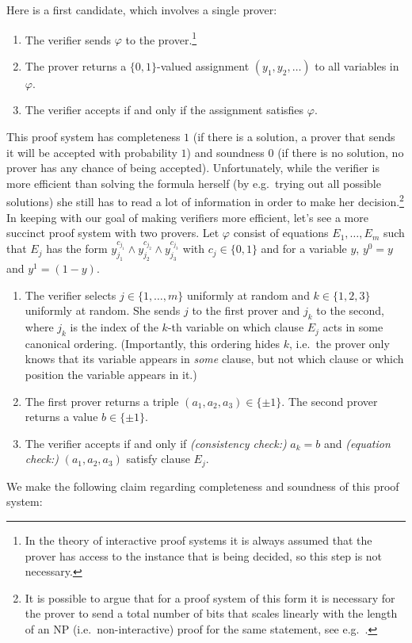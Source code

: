 Here is a first candidate, which involves a single prover:
\begin{enumerate}
\item The verifier sends $\varphi$ to the prover.\footnote{In the theory of interactive proof systems it is always assumed that the prover has access to the instance that is being decided, so this step is not necessary.}
\item The prover returns a $\{0,1\}$-valued assignment $(y_1,y_2,\ldots)$ to all variables in $\varphi$.
\item The verifier accepts if and only if the assignment satisfies $\varphi$. 
\end{enumerate}
This proof system has completeness $1$ (if there is a solution, a prover that sends it will be accepted with probability $1$) and soundness $0$ (if there is no solution, no prover has any chance of being accepted). Unfortunately, while the verifier is more efficient than solving the formula herself (by e.g.\ trying out all possible solutions) she still has to read a lot of information in order to make her decision.\footnote{It is possible to argue that for a proof system of this form it is necessary for the prover to send a total number of bits that scales linearly with the length of an NP (i.e.\ non-interactive) proof for the same statement, see e.g.~\cite{goldreich2001interactive}.} In keeping with our goal of making verifiers more efficient, let's see a more succinct proof system with two provers. Let $\varphi$ consist of equations $E_1,\ldots,E_m$ such that $E_j$ has the form $y_{j_1}^{c_{j_1}}\wedge y_{j_2}^{c_{j_2}}\wedge  y_{j_3}^{c_{j_3}}$ with $c_j\in\{0,1\}$ and for a variable $y$, $y^0=y$ and $y^1=(1-y)$.
\begin{enumerate}
\item The verifier selects $j \in \{1,\ldots,m\}$ uniformly at random and $k\in\{1,2,3\}$ uniformly at random. She sends $j$ to the first prover and $j_k$ to the second, where $j_k$ is the index of the $k$-th variable on which clause $E_j$ acts in some canonical ordering. (Importantly, this ordering hides $k$, i.e.\ the prover only knows that its variable appears in \emph{some} clause, but not which clause or which position the variable appears in it.)
\item The first prover returns a triple $(a_1,a_2,a_3)\in \{\pm 1\}$. The second prover returns a value $b\in \{\pm 1\}$. 
\item The verifier accepts if and only if \emph{(consistency check:)} $a_k = b$ and \emph{(equation check:)} $(a_1,a_2,a_3)$ satisfy clause $E_j$. 
\end{enumerate}
We make the following claim regarding completeness and soundness of this proof system:

